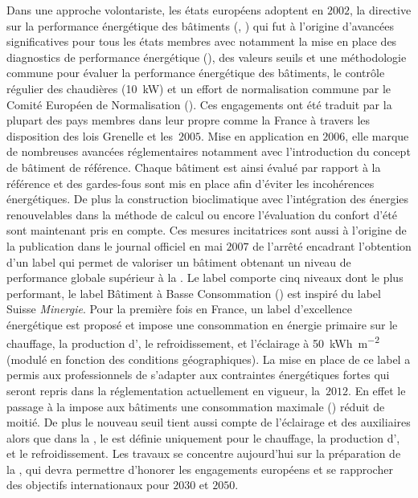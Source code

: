 Dans une approche volontariste, les états européens adoptent en $2002$, la directive sur la
performance énergétique des bâtiments (, \cite{EPBD2002}) qui fut à
l’origine d’avancées significatives pour tous les états membres avec notamment la mise en
place des diagnostics de performance énergétique (), des valeurs seuils et une
méthodologie commune pour évaluer la performance énergétique des bâtiments, le contrôle
régulier des chaudières (\SI{+10}{kW}) et un effort de normalisation commune par le Comité
Européen de Normalisation ().
Ces engagements ont été traduit par la plupart des pays membres dans leur 
propre comme la France à travers les
disposition des lois Grenelle et les \,$2005$.
Mise en application en $2006$, elle marque de nombreuses avancées
réglementaires notamment avec l’introduction du concept de bâtiment de référence. Chaque
bâtiment est ainsi évalué par rapport à la référence et des gardes-fous sont mis en place
afin d’éviter les incohérences énergétiques. De plus la construction bioclimatique avec
l’intégration des énergies renouvelables dans la méthode de calcul ou encore l’évaluation
du confort d’été sont maintenant pris en compte.
Ces mesures incitatrices sont aussi à l’origine de la publication dans le journal officiel
en mai $2007$ de l’arrêté encadrant l’obtention d’un label  qui permet de valoriser
un bâtiment obtenant un niveau de performance globale supérieur à la .
Le label comporte cinq niveaux dont le plus performant, le label Bâtiment à
Basse Consommation ()
est inspiré du label Suisse \textit{Minergie}. Pour la première fois en France, un
label d’excellence énergétique est proposé et impose une consommation en énergie primaire
sur le chauffage, la production d’, le refroidissement, et l’éclairage à
\SI{50}{kWh\per\metre\squared} (modulé en fonction des conditions géographiques).
La mise en place de ce label a permis aux professionnels de s’adapter aux contraintes
énergétiques fortes qui seront repris dans la réglementation actuellement en vigueur, la
\,$2012$.
En effet le passage à la  impose aux bâtiments une consommation maximale ()
réduit de moitié. De plus le nouveau seuil tient aussi compte de l’éclairage et des auxiliaires alors
que dans la , le  est définie uniquement pour le
chauffage, la production d’, et le refroidissement. Les travaux se concentre
aujourd’hui sur la préparation de la , qui devra permettre d’honorer les
engagements européens et se rapprocher des objectifs internationaux pour $2030$ et $2050$.

